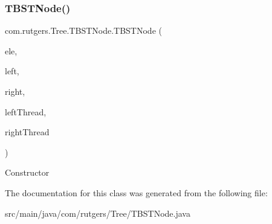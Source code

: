 \subsubsection{\texorpdfstring{T\+B\+S\+T\+Node()}{TBSTNode()}\hspace{0.1cm}{\footnotesize\ttfamily [3/3]}}
{\footnotesize\ttfamily com.\+rutgers.\+Tree.\+T\+B\+S\+T\+Node.\+T\+B\+S\+T\+Node (\begin{DoxyParamCaption}\item[{Number640}]{ele,  }\item[{\hyperlink{classcom_1_1rutgers_1_1Tree_1_1TBSTNode}{T\+B\+S\+T\+Node}}]{left,  }\item[{\hyperlink{classcom_1_1rutgers_1_1Tree_1_1TBSTNode}{T\+B\+S\+T\+Node}}]{right,  }\item[{boolean}]{left\+Thread,  }\item[{boolean}]{right\+Thread }\end{DoxyParamCaption})}

Constructor 

The documentation for this class was generated from the following file\+:\begin{DoxyCompactItemize}
\item 
src/main/java/com/rutgers/\+Tree/T\+B\+S\+T\+Node.\+java\end{DoxyCompactItemize}
